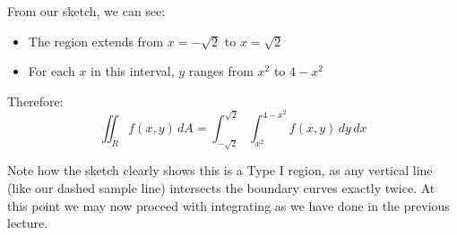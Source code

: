 \begin{example}
\begin{solution}
From our sketch, we can see:
\begin{itemize}
   \item The region extends from $x = -\sqrt{2}$ to $x = \sqrt{2}$
   \item For each $x$ in this interval, $y$ ranges from $x^2$ to $4-x^2$
\end{itemize}

Therefore:
\[
\iint_R f(x,y) \,dA = \int_{-\sqrt{2}}^{\sqrt{2}} \int_{x^2}^{4-x^2} f(x,y) \,dy\,dx
\]

\noindent Note how the sketch clearly shows this is a Type I region, as any vertical line (like our dashed sample line) intersects the boundary curves exactly twice. At this point we may now proceed with integrating as we have done in the previous lecture.
\end{solution}
\end{example}

